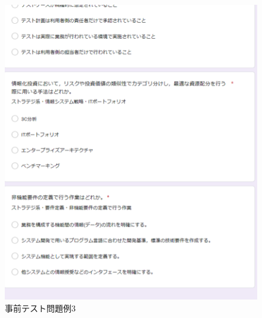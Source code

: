 \begin{figure}[htbp]
\begin{center}
\includegraphics[width=16cm]{img/jizen6.eps}
\end{center}
\caption{事前テスト問題例3}
\label{fig:jizen6}
\end{figure}

